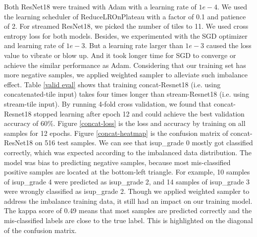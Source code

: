 \documentclass[10pt,twocolumn,letterpaper]{article}
\begin{document}
Both ResNet18 were trained with Adam with a learning rate of $1e-4$. We used the learning scheduler of ReduceLROnPlateau with a factor of 0.1 and patience of 2. For streamed ResNet18, we picked the number of tiles to 11. We used cross entropy loss for both models. Besides, we experimented with the SGD optimizer and learning rate of $1e-3$. But a learning rate larger than $1e-3$ caused the loss value to vibrate or blow up. And it took longer time for SGD to converge or achieve the similar performance as Adam. Considering that our training set has more negative samples, we applied weighted sampler to alleviate such imbalance effect. Table \ref{valid eval} shows that training concat-Resnet18 (i.e. using concatenated-tile input) takes four times longer than stream-Resnet18 (i.e. using stream-tile input). By running 4-fold cross validation, we found that concat-Resnet18 stopped learning after epoch 12 and could achieve the best validation accuracy of $60\%$. Figure \ref{concat-loss} is the loss and accuracy by training on all samples for 12 epochs. Figure \ref{concat-heatmap} is the confusion matrix of concat-ResNet18 on 516 test samples. We can see that isup\_grade 0 mostly got classified correctly, which was expected according to the imbalanced data distribution. The model was bias to predicting negative samples, because most mis-classified positive samples are located at the bottom-left triangle. For example, 10 samples of isup\_grade 4 were predicted as isup\_grade 2, and 14 samples of isup\_grade 3 were wrongly classified as isup\_grade 2. Though we applied weighted sampler to address the imbalance training data, it still had an impact on our training model. The kappa score of 0.49 means that most samples are predicted correctly and the mis-classified labels are close to the true label. This is highlighted on the diagonal of the confusion matrix. \\
\end{document}
